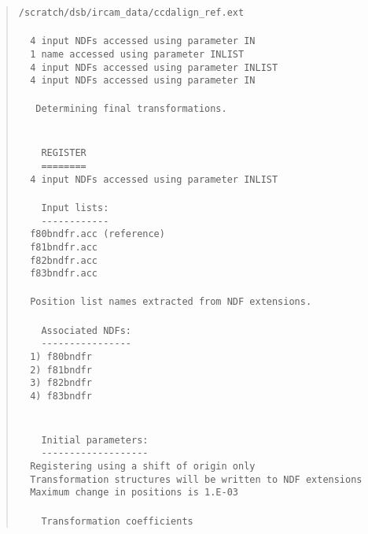 \begin{quote}
\begin{tabbing}
\verb#/scratch/dsb/ircam_data/ccdalign_ref.ext#\\
\verb##\\
\verb#  4 input NDFs accessed using parameter IN#\\
\verb#  1 name accessed using parameter INLIST#\\
\verb#  4 input NDFs accessed using parameter INLIST#\\
\verb#  4 input NDFs accessed using parameter IN#\\
\verb##\\
\verb#   Determining final transformations.#\\
\verb##\\
\verb##\\
\verb#    REGISTER#\\
\verb#    ========#\\
\verb#  4 input NDFs accessed using parameter INLIST#\\
\verb##\\
\verb#    Input lists:#\\
\verb#    ------------#\\
\verb#  f80bndfr.acc (reference)#\\
\verb#  f81bndfr.acc#\\
\verb#  f82bndfr.acc#\\
\verb#  f83bndfr.acc#\\
\verb##\\
\verb#  Position list names extracted from NDF extensions.#\\
\verb##\\
\verb#    Associated NDFs:#\\
\verb#    ----------------#\\
\verb#  1) f80bndfr#\\
\verb#  2) f81bndfr#\\
\verb#  3) f82bndfr#\\
\verb#  4) f83bndfr#\\
\verb##\\
\verb##\\
\verb#    Initial parameters:#\\
\verb#    -------------------#\\
\verb#  Registering using a shift of origin only#\\
\verb#  Transformation structures will be written to NDF extensions#\\
\verb#  Maximum change in positions is 1.E-03#\\
\verb##\\
\verb#    Transformation coefficients#\\

\end{tabbing}
\end{quote}
